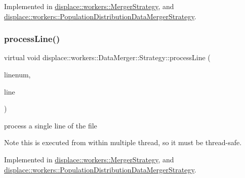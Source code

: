 Implemented in \mbox{\hyperlink{classdisplace_1_1workers_1_1_merger_strategy_a5cfb5bda0541f3f7659aa13e0240fc57}{displace\+::workers\+::\+Merger\+Strategy}}, and \mbox{\hyperlink{classdisplace_1_1workers_1_1_population_distribution_data_merger_strategy_a6ffc92cb6a4864e061f22212d3a4ee23}{displace\+::workers\+::\+Population\+Distribution\+Data\+Merger\+Strategy}}.

\mbox{\label{classdisplace_1_1workers_1_1_data_merger_1_1_strategy_affc6b82b186a4e8fbe2c8adf0a3d136a}} 
\subsubsection{\texorpdfstring{processLine()}{processLine()}}
{\footnotesize\ttfamily virtual void displace\+::workers\+::\+Data\+Merger\+::\+Strategy\+::process\+Line (\begin{DoxyParamCaption}\item[{int}]{linenum,  }\item[{Q\+String}]{line }\end{DoxyParamCaption})\hspace{0.3cm}{\ttfamily [pure virtual]}}



process a single line of the file 

\begin{DoxyNote}{Note}
this is executed from within multiple thread, so it must be thread-\/safe. 
\end{DoxyNote}


Implemented in \mbox{\hyperlink{classdisplace_1_1workers_1_1_merger_strategy_aa434bb1a89c47003426c9d7d41995d58}{displace\+::workers\+::\+Merger\+Strategy}}, and \mbox{\hyperlink{classdisplace_1_1workers_1_1_population_distribution_data_merger_strategy_af69e684d518d2a441c726eb7d8a21501}{displace\+::workers\+::\+Population\+Distribution\+Data\+Merger\+Strategy}}.

\mbox{\label{classdisplace_1_1workers_1_1_data_merger_1_1_strategy_a789b4eee626c5947091e5153e450c91a}} 
